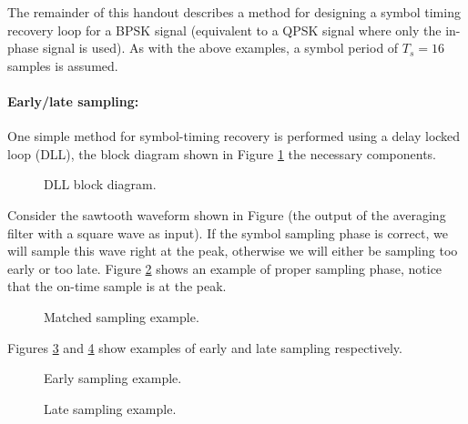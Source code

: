 The remainder of this handout describes a method for designing
a symbol timing recovery loop for a BPSK signal (equivalent to a 
QPSK signal where only the in-phase signal is used).  
As with the above examples,
a symbol period of $T_s = 16$ samples is assumed.  

\paragraph{Early/late sampling:}
One simple method for symbol-timing recovery is performed 
using a delay locked loop (DLL), the block diagram shown  in 
Figure \ref{fig: dll} the necessary components.

\begin{figure}[ht]
   \begin{center}
      \caption{DLL block diagram.}
      \label{fig: dll}
   \end{center}
\end{figure}

Consider the sawtooth waveform shown in Figure (the output of the
averaging filter with a square wave as input). If the symbol sampling 
phase is correct, we will sample this wave right at the peak,
otherwise we will either be sampling too early or too
late.  Figure \ref{fig: on-time_ex} shows an example
of proper sampling phase, notice that the on-time
sample is at the peak.

\begin{figure}[ht]
   \begin{center}
      \caption{Matched sampling example.}
      \label{fig: on-time_ex}
   \end{center}
\end{figure}

Figures \ref{fig: early_ex} and \ref{fig: late_ex}
show examples of early and late sampling respectively.

\begin{figure}[ht]
   \begin{center}
      \caption{Early sampling example.}
      \label{fig: early_ex}
   \end{center}
\end{figure}

\begin{figure}[ht]
   \begin{center}
      \caption{Late sampling example.}
      \label{fig: late_ex}
   \end{center}
\end{figure}


